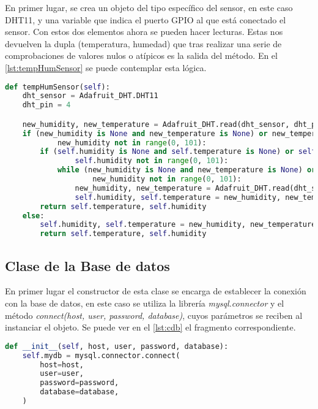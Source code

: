 En primer lugar, se crea un objeto del tipo específico del sensor, en este caso DHT11, y una variable que indica el puerto GPIO al que está conectado el sensor. Con estos dos elementos ahora se pueden hacer lecturas. Estas nos devuelven la dupla (temperatura, humedad) que tras realizar una serie de comprobaciones de valores nulos o atípicos es la salida del método. En el \autoref{lst:tempHumSensor} se puede contemplar esta lógica.
\begin{lstlisting}[language=Python, label=lst:tempHumSensor, caption=Lectura de la temperatura y humedad]
def tempHumSensor(self):
    dht_sensor = Adafruit_DHT.DHT11
    dht_pin = 4

    new_humidity, new_temperature = Adafruit_DHT.read(dht_sensor, dht_pin)
    if (new_humidity is None and new_temperature is None) or new_temperature not in range(0, 101) or \
            new_humidity not in range(0, 101):
        if (self.humidity is None and self.temperature is None) or self.temperature not in range(0, 101) or \
                self.humidity not in range(0, 101):
            while (new_humidity is None and new_temperature is None) or new_temperature not in range(0, 101) or \
                    new_humidity not in range(0, 101):
                new_humidity, new_temperature = Adafruit_DHT.read(dht_sensor, dht_pin)
                self.humidity, self.temperature = new_humidity, new_temperature
        return self.temperature, self.humidity
    else:
        self.humidity, self.temperature = new_humidity, new_temperature
        return self.temperature, self.humidity
\end{lstlisting}

\subsection{Clase de la Base de datos}\label{subsec:clase-de-la-base-de-datos}
En primer lugar el constructor de esta clase se encarga de establecer la conexión con la base de datos, en este caso se utiliza la librería \textit{mysql.connector} y el método \textit{connect(host, user, password, database)}, cuyos parámetros se reciben al instanciar el objeto. Se puede ver en el \autoref{lst:cdb} el fragmento correspondiente.
\begin{lstlisting}[language=Python, label=lst:cdb, caption=Conexión con la base de datos]
def __init__(self, host, user, password, database):
    self.mydb = mysql.connector.connect(
        host=host,
        user=user,
        password=password,
        database=database,
    )
\end{lstlisting}


